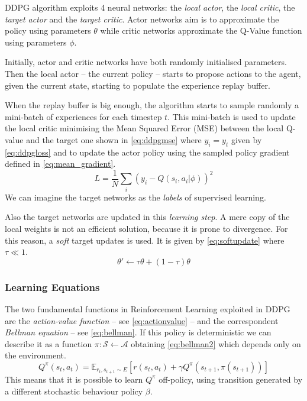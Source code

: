 DDPG algorithm exploits 4 neural networks: the \textit{local actor}, the \textit{local critic}, the \textit{target actor} and the \textit{target critic}. Actor networks aim is to approximate the policy using parameters $\theta$ while critic networks approximate the Q-Value function using parameters $\phi$.

Initially, actor and critic networks have both randomly initialised parameters. Then the local actor -- the current policy -- starts to propose actions to the agent, given the current state, starting to populate the experience replay buffer.

When the replay buffer is big enough, the algorithm starts to sample randomly a mini-batch of experiences for each timestep $t$. This mini-batch is used to update the local critic minimising the Mean Squared Error (MSE) between the local Q-value and the target one shown in \vref{eq:ddpgmse} where $y_i = y_t$ given by \vref{eq:ddpgloss} and to update the actor policy using the sampled policy gradient defined in \vref{eq:mean_gradient}.
\begin{equation}\label{eq:ddpgmse}
	L = \frac{1}{N} \sum_i(y_i -Q(s_i, a_i|\phi))^2
\end{equation}
We can imagine the target networks as the \textit{labels} of supervised learning.

Also the target networks are updated in this \textit{learning step}. A mere copy of the local weights is not an efficient solution, because it is prone to divergence. For this reason, a \textit{soft} target updates is used. It is given by \vref{eq:softupdate} where $\tau \ll 1$.
\begin{equation} \label{eq:softupdate}
	\theta' \leftarrow \tau \theta + (1-\tau)\theta
\end{equation}


\subsubsection{Learning Equations}

The two fundamental functions in Reinforcement Learning exploited in DDPG are the \textit{action-value function} -- see \vref{eq:actionvalue} -- and the correspondent \textit{Bellman equation} -- see \vref{eq:bellman}.
If this policy is deterministic we can describe it as a function $ \pi : \mathcal{S} \leftarrow \mathcal{A}$ obtaining \vref{eq:bellman2} which depends only on the environment.
\begin{equation}\label{eq:bellman2}
	Q^\pi(s_t, a_t) = \mathbb{E}_{r_t,s_{t+1}\sim \mathit{E}}[r(s_t, a_t) + \gamma Q^\pi(s_{t+1}, \pi(s_{t+1}))]
\end{equation}
This means that it is possible to learn $Q^\pi$ off-policy, using transition generated by a different stochastic behaviour policy $\beta$.

